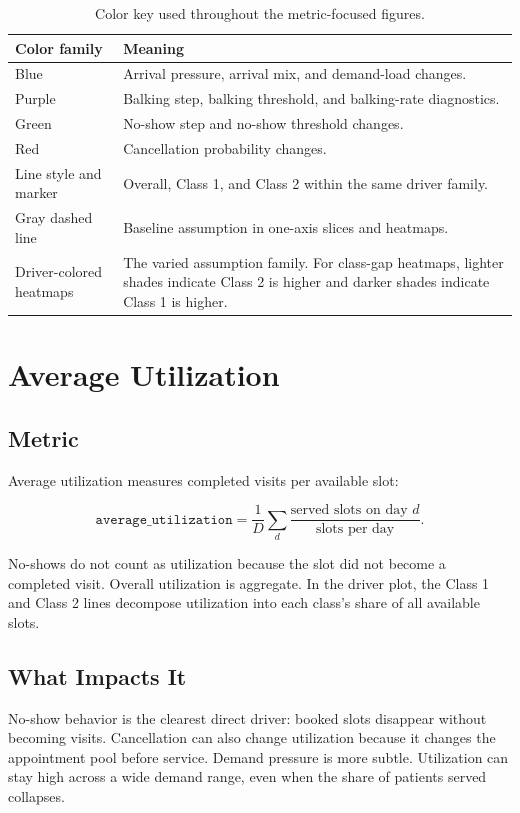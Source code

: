 \documentclass[11pt]{article}
\begin{document}
\begin{table}[H]
\centering
\renewcommand{\arraystretch}{1.12}
\begin{tabular}{p{}p{}}
\toprule
Color family & Meaning \\
\midrule
Blue & Arrival pressure, arrival mix, and demand-load changes. \\
Purple & Balking step, balking threshold, and balking-rate diagnostics. \\
Green & No-show step and no-show threshold changes. \\
Red & Cancellation probability changes. \\
Line style and marker & Overall, Class 1, and Class 2 within the same driver family. \\
Gray dashed line & Baseline assumption in one-axis slices and heatmaps. \\
Driver-colored heatmaps & The varied assumption family. For class-gap heatmaps, lighter shades indicate Class 2 is higher and darker shades indicate Class 1 is higher. \\
\bottomrule
\end{tabular}
\caption{Color key used throughout the metric-focused figures.}
\end{table}

\section{Average Utilization}

\subsection*{Metric}

Average utilization measures completed visits per available slot:

\[
\texttt{average\_utilization} =
\frac{1}{D}\sum_d \frac{\text{served slots on day } d}{\text{slots per day}}.
\]

No-shows do not count as utilization because the slot did not become a completed visit. Overall utilization is aggregate. In the driver plot, the Class 1 and Class 2 lines decompose utilization into each class's share of all available slots.

\subsection*{What Impacts It}

No-show behavior is the clearest direct driver: booked slots disappear without becoming visits. Cancellation can also change utilization because it changes the appointment pool before service. Demand pressure is more subtle. Utilization can stay high across a wide demand range, even when the share of patients served collapses.
\end{document}

